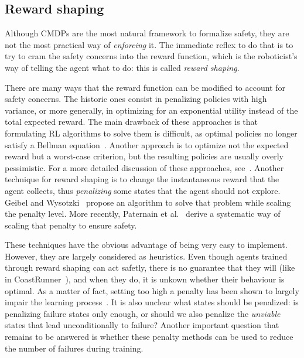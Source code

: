 	\subsection{Reward shaping} 
	Although CMDPs are the most natural framework to formalize safety, they are not the most practical way of\emph{ enforcing} it. The immediate reflex to do that is to try to cram the safety concerns into the reward function, which is the roboticist's way of telling the agent what to do: this is called\emph{ reward shaping}. \par	
	There are many ways that the reward function can be modified to account for safety concerns. The historic ones consist in penalizing policies with high variance, or more generally, in optimizing for an exponential utility instead of the total expected reward. The main drawback of these approaches is that formulating RL algorithms to solve them is difficult, as optimal policies no longer satisfy a Bellman equation~\cite{mihatsch2002risk}. Another approach is to optimize not the expected reward but a worst-case criterion, but the resulting policies are usually overly pessimistic. For a more detailed discussion of these approaches, see~\cite{garcia2015comprehensive}. Another technique for reward shaping is to change the instantaneous reward that the agent collects, thus\emph{ penalizing} some states that the agent should not explore. Geibel and Wysotzki~\cite{geibel2005risk} propose an algorithm to solve that problem while scaling the penalty level. More recently, Paternain et al.~\cite{paternain2019safe} derive a systematic way of scaling that penalty to ensure safety.\par
	These techniques have the obvious advantage of being very easy to implement. However, they are largely considered as heuristics. Even though agents trained through reward shaping can act safetly, there is no guarantee that they will (like in CoastRunner~\cite{clark2016faulty}), and when they do, it is unkown whether their behaviour is optimal. As a matter of fact, setting too high a penalty has been shown to largely impair the learning process~\cite{ray2019benchmarking}. It is also unclear what states should be penalized: is penalizing failure states only enough, or should we also penalize the\emph{ unviable} states that lead unconditionally to failure? Another important question that remains to be answered is whether these penalty methods can be used to reduce the number of failures during training.

